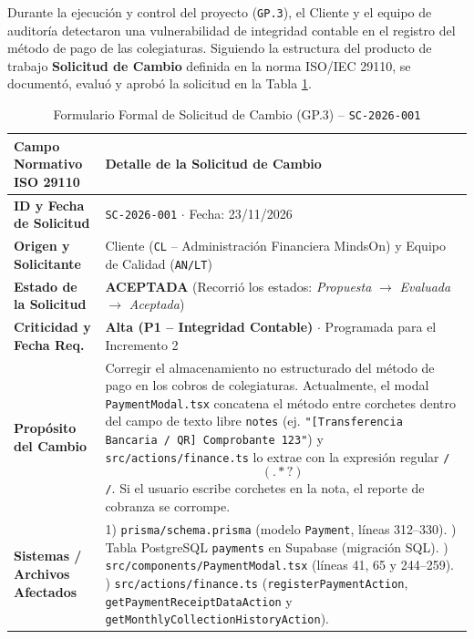 \documentclass[11pt,a4paper]{article}
\begin{document}
Durante la ejecución y control del proyecto (\texttt{GP.3}), el Cliente y el equipo de auditoría detectaron una vulnerabilidad de integridad contable en el registro del método de pago de las colegiaturas. Siguiendo la estructura del producto de trabajo \textbf{Solicitud de Cambio} definida en la norma ISO/IEC 29110, se documentó, evaluó y aprobó la solicitud en la Tabla \ref{tab:cambio}.

\begin{table}[h!]
\centering
\caption{Formulario Formal de Solicitud de Cambio (GP.3) -- \texttt{SC-2026-001}}
\label{tab:cambio}
\renewcommand{\arraystretch}{1.25}
\begin{tabular}{@{}p{4.2cm}p{11.3cm}@{}}
\toprule
\rowcolor{tableHeader}
\textbf{Campo Normativo ISO 29110} & \textbf{Detalle de la Solicitud de Cambio} \\
\midrule
\textbf{ID y Fecha de Solicitud} & \texttt{SC-2026-001} $\cdot$ Fecha: 23/11/2026 \\
\textbf{Origen y Solicitante} & Cliente (\texttt{CL} -- Administración Financiera MindsOn) y Equipo de Calidad (\texttt{AN/LT}) \\
\textbf{Estado de la Solicitud} & \textcolor{okGreen}{\textbf{ACEPTADA}} (Recorrió los estados: \textit{Propuesta} $\rightarrow$ \textit{Evaluada} $\rightarrow$ \textit{Aceptada}) \\
\textbf{Criticidad y Fecha Req.} & \textbf{Alta (P1 -- Integridad Contable)} $\cdot$ Programada para el Incremento 2 \\
\textbf{Propósito del Cambio} & Corregir el almacenamiento no estructurado del método de pago en los cobros de colegiaturas. Actualmente, el modal \texttt{PaymentModal.tsx} concatena el método entre corchetes dentro del campo de texto libre \texttt{notes} (ej. \texttt{"[Transferencia Bancaria / QR] Comprobante 123"}) y \texttt{src/actions/finance.ts} lo extrae con la expresión regular \texttt{/\[(.*?)\]/}. Si el usuario escribe corchetes en la nota, el reporte de cobranza se corrompe. \\
\textbf{Sistemas / Archivos Afectados} & 1) \texttt{prisma/schema.prisma} (modelo \texttt{Payment}, líneas 312--330). \newline
2) Tabla PostgreSQL \texttt{payments} en Supabase (migración SQL). \newline
3) \texttt{src/components/PaymentModal.tsx} (líneas 41, 65 y 244--259). \newline
4) \texttt{src/actions/finance.ts} (\texttt{registerPaymentAction}, \texttt{getPaymentReceiptDataAction} y \texttt{getMonthlyCollectionHistoryAction}). \\

\end{tabular}
\end{table}
\end{document}
